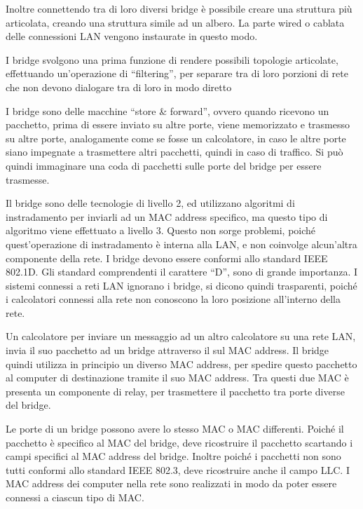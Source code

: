 \documentclass{article}
\numberwithin{equation}{subsection}
\begin{document}
Inoltre connettendo tra di loro diversi bridge è possibile creare una struttura più articolata, creando una struttura simile ad un albero. La 
parte wired o cablata delle connessioni LAN vengono instaurate in questo modo. 



I bridge svolgono una prima funzione di rendere possibili topologie articolate, effettuando un'operazione di ``filtering'', per separare tra di loro porzioni di rete che 
non devono dialogare tra di loro in modo diretto


I bridge sono delle macchine ``store \& forward'', ovvero quando ricevono un pacchetto, prima di essere inviato su altre porte, viene 
memorizzato e trasmesso su altre porte, analogamente come se fosse un calcolatore, in caso le altre porte siano impegnate a trasmettere altri 
pacchetti, quindi in caso di traffico. Si può quindi immaginare una coda di pacchetti sulle porte del bridge per essere trasmesse. 

Il bridge sono delle tecnologie di livello 2, ed utilizzano algoritmi di instradamento per inviarli ad un MAC address specifico, ma questo tipo di 
algoritmo viene effettuato a livello 3. Questo non sorge problemi, poiché quest'operazione di instradamento è interna alla LAN, e non coinvolge alcun'altra componente 
della rete. I bridge devono essere conformi allo standard IEEE 802.1D. Gli standard comprendenti il carattere ``D'', sono di grande importanza. 
I sistemi connessi a reti LAN ignorano i bridge, si dicono quindi trasparenti, poiché i calcolatori connessi alla rete non conoscono la loro posizione all'interno della 
rete. 


Un calcolatore per inviare un messaggio ad un altro calcolatore su una rete LAN, invia il suo pacchetto ad un bridge attraverso il sul MAC address. Il bridge quindi 
utilizza in principio un diverso MAC address, per spedire questo pacchetto al computer di destinazione tramite il suo MAC address. Tra questi due MAC è presenta un 
componente di relay, per trasmettere il pacchetto tra porte diverse del bridge. 


Le porte di un bridge possono avere lo stesso MAC o MAC differenti. Poiché il pacchetto è specifico al MAC del bridge, deve ricostruire il pacchetto scartando i campi 
specifici al MAC address del bridge. Inoltre poiché i pacchetti non sono tutti conformi allo standard IEEE 802.3, deve ricostruire anche il campo LLC. I MAC address 
dei computer nella rete sono realizzati in modo da poter essere connessi a ciascun tipo di MAC. 
\end{document}
